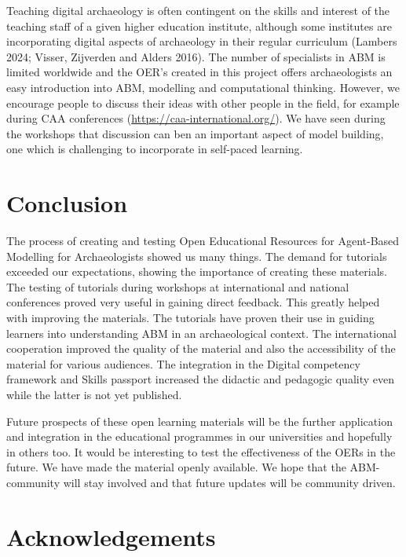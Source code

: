 \documentclass[
]{article}
\begin{document}
Teaching digital archaeology is often contingent on the skills and interest of the teaching staff of a given higher education institute, although some institutes are incorporating digital aspects of archaeology in their regular curriculum (Lambers 2024; Visser, Zijverden and Alders 2016). The number of specialists in ABM is limited worldwide and the OER's created in this project offers archaeologists an easy introduction into ABM, modelling and computational thinking. However, we encourage people to discuss their ideas with other people in the field, for example during CAA conferences (\protect\hyperlink{0}{https://caa-international.org/}). We have seen during the workshops that discussion can ben an important aspect of model building, one which is challenging to incorporate in self-paced learning.

\hypertarget{conclusion}{%
\section{Conclusion}\label{conclusion}}

The process of creating and testing Open Educational Resources for Agent-Based Modelling for Archaeologists showed us many things. The demand for tutorials exceeded our expectations, showing the importance of creating these materials. The testing of tutorials during workshops at international and national conferences proved very useful in gaining direct feedback. This greatly helped with improving the materials. The tutorials have proven their use in guiding learners into understanding ABM in an archaeological context. The international cooperation improved the quality of the material and also the accessibility of the material for various audiences. The integration in the Digital competency framework and Skills passport increased the didactic and pedagogic quality even while the latter is not yet published.

Future prospects of these open learning materials will be the further application and integration in the educational programmes in our universities and hopefully in others too. It would be interesting to test the effectiveness of the OERs in the future. We have made the material openly available. We hope that the ABM-community will stay involved and that future updates will be community driven.

\hypertarget{acknowledgements}{%
\section{Acknowledgements}\label{acknowledgements}}
\end{document}
